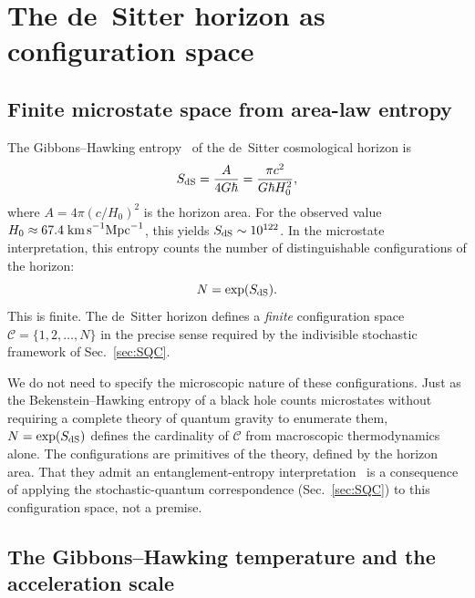 \documentclass[aps,prd,twocolumn,superscriptaddress,nofootinbib]{revtex4-2}
\begin{document}
\section{The de~Sitter horizon as configuration space}
\label{sec:deSitter}

\subsection{Finite microstate space from area-law entropy}

The Gibbons--Hawking entropy~\cite{GibbonsHawking1977} of the de~Sitter cosmological horizon is
\begin{equation}
S_{\rm dS} = \frac{A}{4G\hbar} = \frac{\pi c^2}{G\hbar H_0^2},
\label{eq:GH_entropy}
\end{equation}
where $A = 4\pi (c/H_0)^2$ is the horizon area. For the observed value $H_0 \approx 67.4\;\text{km\,s}^{-1}\text{Mpc}^{-1}$, this yields $S_{\rm dS} \sim 10^{122}$. In the microstate interpretation, this entropy counts the number of distinguishable configurations of the horizon:
\begin{equation}
N = \exp(S_{\rm dS}).
\label{eq:N_configs}
\end{equation}
This is finite. The de~Sitter horizon defines a \emph{finite} configuration space $\mathcal{C} = \{1, 2, \ldots, N\}$ in the precise sense required by the indivisible stochastic framework of Sec.~\ref{sec:SQC}.

We do not need to specify the microscopic nature of these configurations. Just as the Bekenstein--Hawking entropy of a black hole counts microstates without requiring a complete theory of quantum gravity to enumerate them, $N = \exp(S_{\rm dS})$ defines the cardinality of $\mathcal{C}$ from macroscopic thermodynamics alone. The configurations are primitives of the theory, defined by the horizon area. That they admit an entanglement-entropy interpretation~\cite{RyuTakayanagi2006,VanRaamsdonk2010} is a consequence of applying the stochastic-quantum correspondence (Sec.~\ref{sec:SQC}) to this configuration space, not a premise.

\subsection{The Gibbons--Hawking temperature and the acceleration scale}
\end{document}
